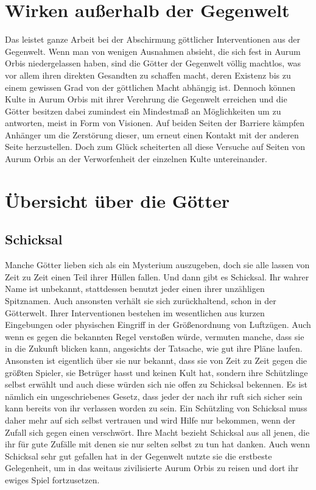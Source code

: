 \documentclass[a4paper,12pt,oneside]{book}
\begin{document}
\section{Wirken außerhalb der Gegenwelt}
Das \uline{} leistet ganze Arbeit bei der Abschirmung göttlicher Interventionen aus der Gegenwelt. Wenn man von wenigen Ausnahmen absieht, die sich fest in Aurum Orbis niedergelassen haben, sind die Götter der Gegenwelt völlig machtlos, was vor allem ihren direkten Gesandten zu schaffen macht, deren Existenz bis zu einem gewissen Grad von der göttlichen Macht abhängig ist. Dennoch können Kulte in Aurum Orbis mit ihrer Verehrung die Gegenwelt erreichen und die Götter besitzen dabei zumindest ein Mindestmaß an Möglichkeiten um zu antworten, meist in Form von Visionen. Auf beiden Seiten der Barriere kämpfen Anhänger um die Zerstörung dieser, um erneut einen Kontakt mit der anderen Seite herzustellen. Doch zum Glück scheiterten all diese Versuche auf Seiten von Aurum Orbis an der Verworfenheit der einzelnen Kulte untereinander.

\section{Übersicht über die Götter}

\subsection{Schicksal}
Manche Götter lieben sich als ein Mysterium auszugeben, doch sie alle lassen von Zeit zu Zeit einen Teil ihrer Hüllen fallen. Und dann gibt es Schicksal. Ihr wahrer Name ist unbekannt, stattdessen benutzt jeder einen ihrer unzähligen Spitznamen. Auch ansonsten verhält sie sich zurückhaltend, schon in der Götterwelt. Ihrer Interventionen bestehen im wesentlichen aus kurzen Eingebungen oder physischen Eingriff in der Größenordnung von Luftzügen. Auch wenn es gegen die bekannten Regel verstoßen würde, vermuten manche, dass sie in die Zukunft blicken kann, angesichts der Tatsache, wie gut ihre Pläne laufen. Ansonsten ist eigentlich über sie nur bekannt, dass sie von Zeit zu Zeit gegen die größten Spieler, sie Betrüger hasst und keinen Kult hat, sondern ihre Schützlinge selbst erwählt und auch diese würden sich nie offen zu Schicksal bekennen. Es ist nämlich ein ungeschriebenes Gesetz, dass jeder der nach ihr ruft sich sicher sein kann bereits von ihr verlassen worden zu sein. Ein Schützling von Schicksal muss daher mehr auf sich selbst vertrauen und wird Hilfe nur bekommen, wenn der Zufall sich gegen einen verschwört. Ihre Macht bezieht Schicksal aus all jenen, die ihr für gute Zufälle mit denen sie nur selten selbst zu tun hat danken. Auch wenn Schicksal sehr gut gefallen hat in der Gegenwelt nutzte sie die erstbeste Gelegenheit, um in das weitaus zivilisierte Aurum Orbis zu reisen und dort ihr ewiges Spiel fortzusetzen.
\end{document}
